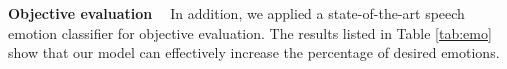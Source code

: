 \documentclass{article}
\begin{document}


\noindent \textbf{Objective evaluation \ } In addition, we applied a state-of-the-art speech emotion classifier \cite{mirsamadi2017automatic} for objective evaluation. The results listed in Table \ref{tab:emo} show that our model can effectively increase the percentage of desired emotions. 


\end{document}
